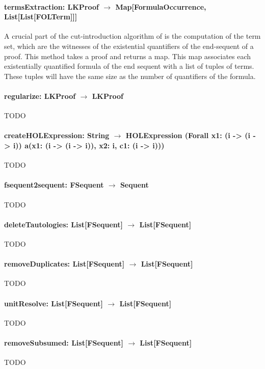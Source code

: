 \documentclass[a4paper,11pt]{article}
\begin{document}
\begin{appendix}
\paragraph{\textbf{termsExtraction: LKProof $\rightarrow$ Map[FormulaOccurrence, List[List[FOLTerm]]]}}
A crucial part of the cut-introduction algorithm of \cite{Hetzl2012} is the
computation of the term set, which are the witnesses of the existential
quantifiers of the end-sequent of a proof. This method takes a proof and returns
a map. This map associates each existentially quantified formula of the end
sequent with a list of tuples of terms. These tuples will have the same size as
the number of quantifiers of the formula.

\paragraph{\textbf{regularize: LKProof $\rightarrow$ LKProof}}
{\color{red}TODO}

\paragraph{\textbf{createHOLExpression: String $\rightarrow$ HOLExpression
(Forall x1: (i -> (i -> i)) a(x1: (i -> (i -> i)), x2: i, c1: (i -> i)))}}
{\color{red}TODO}

\paragraph{\textbf{fsequent2sequent: FSequent $\rightarrow$ Sequent}}
{\color{red}TODO}

\paragraph{\textbf{deleteTautologies: List[FSequent] $\rightarrow$ List[FSequent]}}
{\color{red}TODO}

\paragraph{\textbf{removeDuplicates: List[FSequent] $\rightarrow$ List[FSequent]}}
{\color{red}TODO}

\paragraph{\textbf{unitResolve: List[FSequent] $\rightarrow$ List[FSequent]}}
{\color{red}TODO}

\paragraph{\textbf{removeSubsumed: List[FSequent] $\rightarrow$ List[FSequent]}}
{\color{red}TODO}


\end{appendix}
\end{document}
